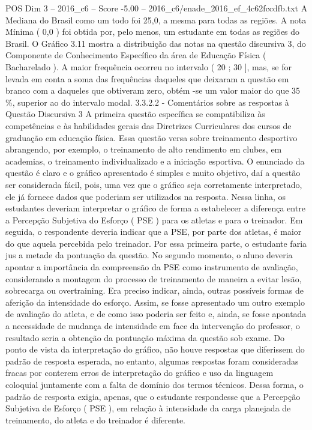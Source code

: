 \begin{textsample}{POS Dim 3 – 2016\_c6 – Score -5.00 – 2016\_c6/enade\_2016\_ef\_4c62fccdfb.txt}
A Mediana do Brasil como um todo foi 25,0, a mesma para todas as regiões.
A nota Mínima ( 0,0 ) foi obtida por, pelo menos, um estudante em todas as regiões do Brasil.
O Gráfico 3.11 mostra a distribuição das notas na questão discursiva 3, do Componente de Conhecimento Específico da área de Educação Física ( Bacharelado ).
A maior frequência ocorreu no intervalo ( 20 ; 30 ], mas, se for levada em conta a soma das frequências daqueles que deixaram a questão em branco com a daqueles que obtiveram zero, obtém -se um valor maior do que 35 \%, superior ao do intervalo modal. 3.3.2.2 - Comentários sobre as respostas à Questão Discursiva 3 A primeira questão específica se compatibiliza às competências e às habilidades gerais das Diretrizes Curriculares dos cursos de graduação em educação física.
Essa questão versa sobre treinamento desportivo abrangendo, por exemplo, o treinamento de alto rendimento em clubes, em academias, o treinamento individualizado e a iniciação esportiva.
O enunciado da questão é claro e o gráfico apresentado é simples e muito objetivo, daí a questão ser considerada fácil, pois, uma vez que o gráfico seja corretamente interpretado, ele já fornece dados que poderiam ser utilizados na resposta.
Nessa linha, os estudantes deveriam interpretar o gráfico de forma a estabelecer a diferença entre a Percepção Subjetiva do Esforço ( PSE ) para os atletas e para o treinador.
Em seguida, o respondente deveria indicar que a PSE, por parte dos atletas, é maior do que aquela percebida pelo treinador.
Por essa primeira parte, o estudante faria jus a metade da pontuação da questão.
No segundo momento, o aluno deveria apontar a importância da compreensão da PSE como instrumento de avaliação, considerando a montagem do processo de treinamento de maneira a evitar lesão, sobrecarga ou overtraining.
Era preciso indicar, ainda, outras possíveis formas de aferição da intensidade do esforço.
Assim, se fosse apresentado um outro exemplo de avaliação do atleta, e de como isso poderia ser feito e, ainda, se fosse apontada a necessidade de mudança de intensidade em face da intervenção do professor, o resultado seria a obtenção da pontuação máxima da questão sob exame.
Do ponto de vista da interpretação do gráfico, não houve respostas que diferissem do padrão de resposta esperada, no entanto, algumas respostas foram consideradas fracas por conterem erros de interpretação do gráfico e uso da linguagem coloquial juntamente com a falta de domínio dos termos técnicos.
Dessa forma, o padrão de resposta exigia, apenas, que o estudante respondesse que a Percepção Subjetiva de Esforço ( PSE ), em relação à intensidade da carga planejada de treinamento, do atleta e do treinador é diferente.

\end{textsample}
